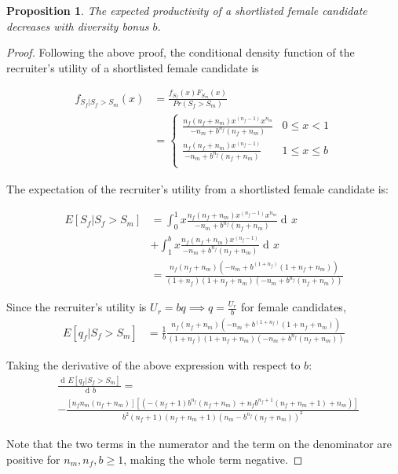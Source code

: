 \documentclass[11pt]{article}
\DeclareMathOperator{\di}{d\!}
\newtheorem{proposition}{Proposition}
\begin{document}
\begin{proposition}\label{prop_female_exp_qual}
    The expected productivity of a shortlisted female candidate decreases with diversity bonus $b$.
\end{proposition}
\begin{proof}
    Following the above proof, the conditional density function of the recruiter's utility of a shortlisted female candidate is

    \begin{align*}
        f_{S_f|S_f>S_m}(x) & = \frac{f_{S_f}(x)F_{S_m}(x) }{Pr(S_f > S_m)} \\
                           & = \begin{cases}
            \frac{n_f(n_f+n_m)x^{(n_f-1)}x^{n_m}}{-n_m+b^{n_f}(n_f+n_m)} & 0 \leq x < 1    \\
            \frac{n_f(n_f+n_m)x^{(n_f-1)}}{-n_m+b^{n_f}(n_f+n_m)}        & 1 \leq x \leq b \\
        \end{cases}
    \end{align*}

    The expectation of the recruiter's utility from a shortlisted female candidate is:

    \begin{align*}
        E[S_f|S_f > S_m] & = \int_0^1{x \frac{ n_f(n_f+n_m)x^{(n_f-1)}x^{n_m}}{-n_m+b^{n_f}(n_f+n_m)} \di x}                 \\
                         & + \int_1^b{x \frac{n_f(n_f+n_m)x^{(n_f-1)}}{-n_m+b^{n_f}(n_f+n_m)} \di x}                         \\
                         & = \frac{n_f(n_f+n_m)(-n_m+b^{(1+n_f)} (1+n_f+n_m))}{(1+n_f) (1+n_f+n_m) (-n_m+b^{n_f} (n_f+n_m))}
    \end{align*}

    Since the recruiter's utility is $U_r = bq \implies q = \frac{U_r}{b}$ for female candidates,
    \begin{align*}
        E[q_f|S_f > S_m] & = \frac{1}{b} \frac{n_f(n_f+n_m)(-n_m+b^{(1+n_f)} (1+n_f+n_m))} {(1+n_f) (1+n_f+n_m) (-n_m+b^{n_f} (n_f+n_m))}
    \end{align*}

    Taking the derivative of the above expression with respect to $b$:
    \begin{align*}
         & \frac{\di E[q_f|S_f > S_m]} {\di b}  =                                                                                                                             \\
         & - \frac{[n_f n_m (n_f+n_m)] [\left(-(n_f+1) b^{n_f} (n_f+n_m)+n_f b^{n_f+1} (n_f+n_m+1)+n_m\right)]}{b^2 (n_f+1) (n_f+n_m+1) \left(n_m-b^{n_f} (n_f+n_m)\right)^2}
    \end{align*}

    Note that the two terms in the numerator and the term on the denominator are positive for $n_m, n_f, b \geq 1$, making the whole term negative.

\end{proof}
\end{document}

